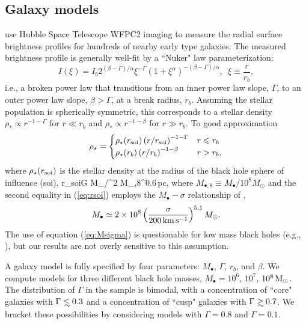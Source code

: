 \documentclass[usenatbib,fleqn]{mn2e}
\newcommand\lsim{\mathrel{\rlap{\lower4pt\hbox{\hskip1pt$\sim$}}
    \raise1pt\hbox{$<$}}}
\newcommand\gsim{\mathrel{\rlap{\lower4pt\hbox{\hskip1pt$\sim$}}
    \raise1pt\hbox{$>$}}}
\newcommand{\rb}{r_b}
\newcommand{\rhostar}{\rho_*}
\newcommand{\Mbh}[1][]{M_{\bullet#1}}
\newcommand{\soi}{\rm soi}
\newcommand{\rsoi}{r_{\soi}}
\begin{document}
\subsection{Galaxy models}
\citet{LauerFaber+:2007a} use Hubble Space Telescope WFPC2 imaging to measure the radial surface brightness profiles for hundreds of nearby early type galaxies. The measured brightness profile is generally well-fit by a ``Nuker" law parameterization:
\begin{equation}
  I(\xi)=I_b 2^{(\beta-\Gamma)/\alpha} \xi^{-\Gamma} (1+\xi^\alpha)^{-(\beta-\Gamma)/\alpha}, \,\,\,\xi\equiv\frac{r}{r_b},
\end{equation}
i.e., a broken power law that transitions from an inner power law slope, $\Gamma$, to an outer power law slope, $\beta > \Gamma$, at a break radius, $\rb$.  Assuming the stellar population is spherically symmetric, this corresponds to a stellar density $\rhostar \propto r^{-1-\Gamma}$ for $r \ll \rb$ and $\rhostar\propto r^{-1-\beta}$ for $r \gg \rb$.  To good approximation
\begin{align}
\rho_\star = 
\begin{cases}
\rho_\star(\rsoi) \left(r/\rsoi\right)^{-1-\Gamma} & r \leq r_b\\
\rho_\star(r_b) \left(r/r_b\right)^{-1-\beta} & r > r_b,
\label{eq:rhostar}
\end{cases}
\end{align}
where $\rho_\star(\rsoi)$ is the stellar density at the radius of the black hole sphere of influence (soi), 
\be
\rsoi \simeq G \Mbh/\sigma^2  M_{\bullet,8}^{0.6}\,{\rm pc},
\label{eq:rsoi}
\ee
where $M_{\bullet,8} \equiv M_{\bullet}/10^{8}M_{\odot}$ and the second equality in (\ref{eq:rsoi}) employs the $\Mbh-\sigma$ relationship of \citet{Gultekin+09},
 \begin{align}
M_{\bullet} \simeq 2\times 10^{8}\left(\frac{\sigma}{200\,{\rm
      km\,s^{-1}}}\right)^{5.1}M_{\odot}.
\label{eq:Msigma}
\end{align}
The use of equation (\ref{eq:Msigma}) is questionable for low mass black holes (e.g., \citealt{Greene&Ho07}), but our results are not overly sensitive to this assumption.  

A galaxy model is fully specified by four parameters: $\Mbh$,
$\Gamma$, $r_b$, and $\beta$.  We compute models for three different
black hole masses, $\Mbh = 10^6$, $10^7$, $10^8 \,{\rm M_\odot}$.  The
distribution of $\Gamma$ in the \citet{LauerFaber+:2007a} sample is
bimodal, with a concentration of ``core" galaxies with $\Gamma \lsim
0.3$ and a concentration of ``cusp" galaxies with $\Gamma \gsim 0.7$.
We bracket these possibilities by considering models with $\Gamma=0.8$
and $\Gamma=0.1$.  
\end{document}
